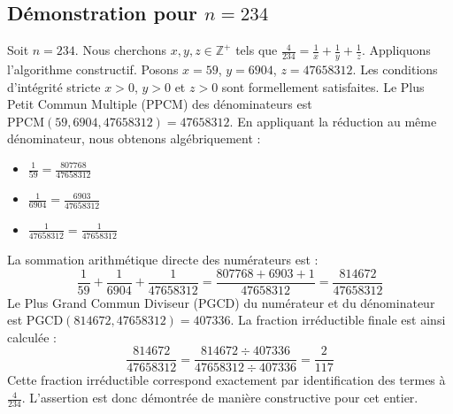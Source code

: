 \documentclass[11pt,a4paper]{article}
\begin{document}
\subsection{Démonstration pour $n = 234$}
Soit $n = 234$. Nous cherchons $x, y, z \in \mathbb{Z}^{+}$ tels que $\frac{4}{234} = \frac{1}{x} + \frac{1}{y} + \frac{1}{z}$.
Appliquons l'algorithme constructif. Posons $x = 59$, $y = 6904$, $z = 47658312$.
Les conditions d'intégrité stricte $x > 0$, $y > 0$ et $z > 0$ sont formellement satisfaites.
Le Plus Petit Commun Multiple (PPCM) des dénominateurs est $\text{PPCM}(59, 6904, 47658312) = 47658312$.
En appliquant la réduction au même dénominateur, nous obtenons algébriquement :
\begin{itemize}
    \item $\frac{1}{59} = \frac{807768}{47658312}$
    \item $\frac{1}{6904} = \frac{6903}{47658312}$
    \item $\frac{1}{47658312} = \frac{1}{47658312}$
\end{itemize}
La sommation arithmétique directe des numérateurs est :
$$ \frac{1}{59} + \frac{1}{6904} + \frac{1}{47658312} = \frac{807768 + 6903 + 1}{47658312} = \frac{814672}{47658312} $$
Le Plus Grand Commun Diviseur (PGCD) du numérateur et du dénominateur est $\text{PGCD}(814672, 47658312) = 407336$.
La fraction irréductible finale est ainsi calculée :
$$ \frac{814672}{47658312} = \frac{814672 \div 407336}{47658312 \div 407336} = \frac{2}{117} $$
Cette fraction irréductible correspond exactement par identification des termes à $\frac{4}{234}$. L'assertion est donc démontrée de manière constructive pour cet entier.
\end{document}

